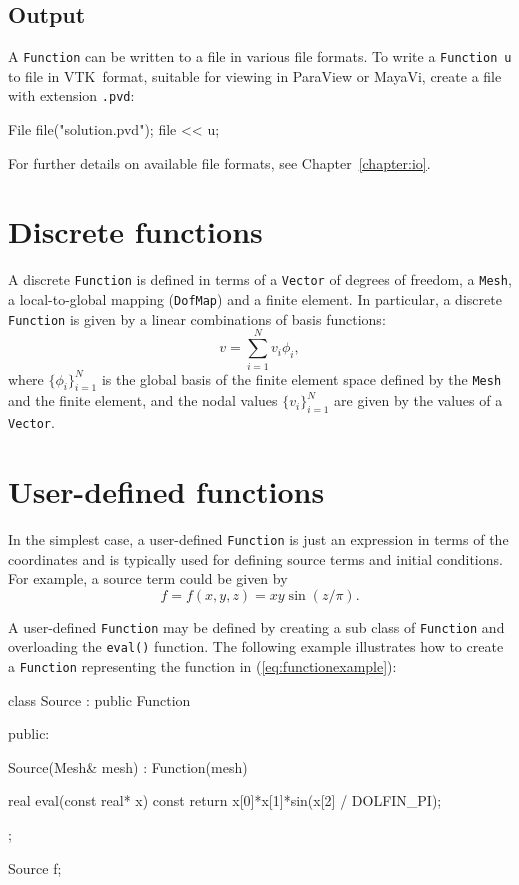\subsection{Output}

A \texttt{Function} can be written to a file in various file formats.
To write a \texttt{Function}~\texttt{u} to file in VTK~format,
suitable for viewing in ParaView or MayaVi, create a file with
extension \texttt{.pvd}:
\begin{code}
File file("solution.pvd");
file << u;
\end{code}

For further details on available file formats, see
Chapter~\ref{chapter:io}.

\section{Discrete functions}

A discrete \texttt{Function} is defined in terms of a
\texttt{Vector} of degrees of freedom, a \texttt{Mesh}, a
local-to-global mapping (\texttt{DofMap}) and a finite element.  In
particular, a discrete \texttt{Function} is given by a linear
combinations of basis functions:
\begin{equation}
  v = \sum_{i=1}^{N} v_i \phi_{i},
\end{equation}
where $\{\phi_i\}_{i=1}^N$ is the global basis of the finite element
space defined by the \texttt{Mesh} and the finite element, and
the nodal values $\{v_i\}_{i=1}^N$ are given by the values of a
\texttt{Vector}.

\section{User-defined functions}

In the simplest case, a user-defined \texttt{Function} is just an
expression in terms of the coordinates and is typically used for
defining source terms and initial conditions. For example, a source
term could be given by
\begin{equation} \label{eq:functionexample}
  f = f(x, y, z) = xy \sin(z / \pi).
\end{equation}

A user-defined \texttt{Function} may be defined by creating a sub
class of \texttt{Function} and overloading the \texttt{eval()}
function.  The following example illustrates how to create a
\texttt{Function} representing the function in
(\ref{eq:functionexample}):
\begin{code}
class Source : public Function
{
public:
    
  Source(Mesh& mesh) : Function(mesh) {}

  real eval(const real* x) const
  {
    return x[0]*x[1]*sin(x[2] / DOLFIN_PI);
  }

};

Source f;
\end{code}


